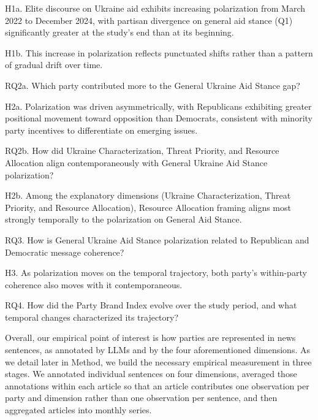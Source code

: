 H1a. Elite discourse on Ukraine aid exhibits increasing polarization from March 2022 to December 2024, with partisan divergence on general aid stance (Q1) significantly greater at the study's end than at its beginning.

H1b. This increase in polarization reflects punctuated shifts rather than a pattern of gradual drift over time.

RQ2a. Which party contributed more to the General Ukraine Aid Stance gap?

H2a. Polarization was driven asymmetrically, with Republicans exhibiting greater positional movement toward opposition than Democrats, consistent with minority party incentives to differentiate on emerging issues.

RQ2b. How did Ukraine Characterization, Threat Priority, and Resource Allocation align contemporaneously with General Ukraine Aid Stance polarization?

H2b. Among the explanatory dimensions (Ukraine Characterization, Threat Priority, and Resource Allocation), Resource Allocation framing aligns most strongly temporally to the polarization on General Aid Stance.

RQ3. How is General Ukraine Aid Stance polarization related to Republican and Democratic message coherence?

H3. As polarization moves on the temporal trajectory, both party's within-party coherence also moves with it contemporaneous.

RQ4. How did the Party Brand Index evolve over the study period, and what temporal changes characterized its trajectory?

Overall, our empirical point of interest is how parties are represented in news sentences, as annotated by LLMs and by the four aforementioned dimensions. As we detail later in Method, we build the necessary empirical measurement in three stages. We annotated individual sentences on four dimensions, averaged those annotations within each article so that an article contributes one observation per party and dimension rather than one observation per sentence, and then aggregated articles into monthly series.

